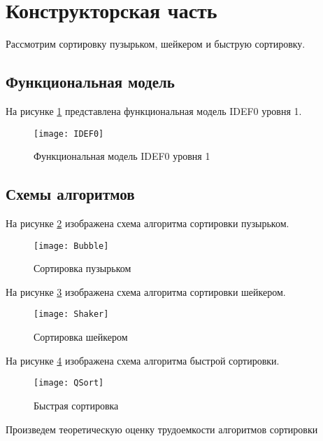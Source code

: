 \newpage
\section{Конструкторская часть}

Рассмотрим сортировку пузырьком, шейкером и быструю сортировку.

\subsection{Функциональная модель}

На рисунке \ref{img:IDEF0} представлена функциональная модель IDEF0 уровня 1.

\begin{figure}[H]
    \centering
    \texttt{[image: IDEF0]}
    \caption{Функциональная модель IDEF0 уровня 1}
    \label{img:IDEF0}
\end{figure}

\subsection{Схемы алгоритмов}

На рисунке \ref{img:bubble} изображена схема алгоритма сортировки пузырьком.

\begin{figure}[H]
    \centering
    \texttt{[image: Bubble]}
    \caption{Сортировка пузырьком}
    \label{img:bubble}
\end{figure}

На рисунке \ref{img:shaker} изображена схема алгоритма сортировки шейкером.

\begin{figure}[H]
    \centering
    \texttt{[image: Shaker]}
    \caption{Сортировка шейкером}
    \label{img:shaker}
\end{figure}

На рисунке \ref{img:qsort} изображена схема алгоритма быстрой сортировки.

\begin{figure}[H]
    \centering
    \texttt{[image: QSort]}
    \caption{Быстрая сортировка}
    \label{img:qsort}
\end{figure}

Произведем теоретическую оценку трудоемкости алгоритмов сортировки

